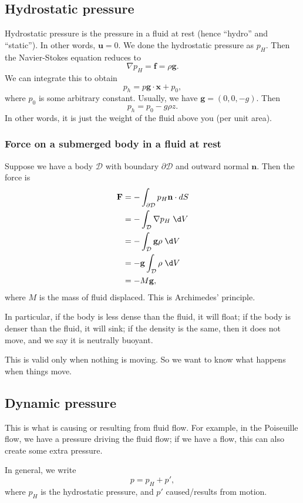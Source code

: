 \documentclass[a4paper]{article}
\begin{document}
\subsection{Hydrostatic pressure}
Hydrostatic pressure is the pressure in a fluid at rest (hence ``hydro'' and ``static''). In other words, $\mathbf{u} = 0$. We done the hydrostatic pressure as $p_H$. Then the Navier-Stokes equation reduces to
\[
  \nabla p_H = \mathbf{f} = \rho \mathbf{g}.
\]
We can integrate this to obtain
\[
  p_h = p \mathbf{g}\cdot \mathbf{x} + p_0,
\]
where $p_0$ is some arbitrary constant. Usually, we have $\mathbf{g} = (0, 0, -g)$. Then
\[
  p_h = p_0 - g \rho z.
\]
In other words, it is just the weight of the fluid above you (per unit area).

\subsubsection{Force on a submerged body in a fluid at rest}
Suppose we have a body $\mathcal{D}$ with boundary $\partial \mathcal{D}$ and outward normal $\mathbf{n}$. Then the force is
\begin{align*}
  \mathbf{F} &= - \int_{\partial \mathcal{D}} p_H \mathbf{n}\cdot dS \\
  &= - \int_\mathcal{D} \nabla p_H \;\d V\\
  &= - \int_{\mathcal{D}} \mathbf{g} \rho \;\d V\\
  &= - \mathbf{g} \int_\mathcal{D} \rho \;\d V\\
  &= - M\mathbf{g},
\end{align*}
where $M$ is the mass of fluid displaced. This is Archimedes' principle.

In particular, if the body is less dense than the fluid, it will float; if the body is denser than the fluid, it will sink; if the density is the same, then it does not move, and we say it is neutrally buoyant.

This is valid only when nothing is moving. So we want to know what happens when things move.

\subsection{Dynamic pressure}
This is what is causing or resulting from fluid flow. For example, in the Poiseuille flow, we have a pressure driving the fluid flow; if we have a flow, this can also create some extra pressure.

In general, we write
\[
  p = p_H + p',
\]
where $p_H$ is the hydrostatic pressure, and $p'$ caused/results from motion.
\end{document}

